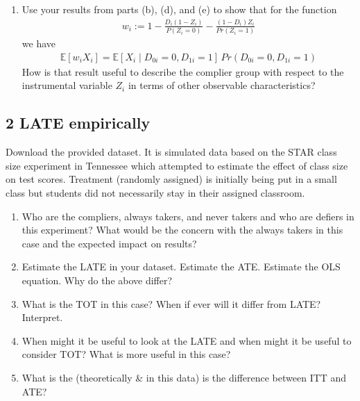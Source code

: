 \documentclass[11pt]{article}
\begin{document}
\begin{enumerate}[label=\alph*)]
    \item Use your results from parts (b), (d), and (e) to show that for the function 
    \begin{align*}
        w_i := 1 - \frac{D_i(1 - Z_i)}{P (Z_i=0)} -  \frac{(1-D_i)Z_i }{Pr (Z_i=1)}
    \end{align*} we have 
    \begin{align*}
        \mathbb{E}[w_i X_i] = \mathbb{E}[X_i \mid D_{0i} = 0, D_{1i} = 1]\, Pr(D_{0i} = 0, D_{1i} = 1)
    \end{align*} How is that result useful to describe the complier group with respect to the instrumental variable $Z_i$ in terms of other observable characteristics?

\end{enumerate}



\subsection*{2 LATE empirically}
Download the provided dataset. It is simulated data based on the STAR class size experiment in Tennessee which attempted to estimate the effect of class size on test scores. Treatment (randomly assigned) is initially being put in a small class but students did not necessarily stay in their assigned classroom.

\begin{enumerate}[label=\alph*)]
    \item Who are the compliers, always takers, and never takers and who are defiers in this experiment? What would be the concern with the always takers in this case and the expected impact on results?
    \item Estimate the LATE in your dataset. Estimate the ATE. Estimate the OLS equation. Why do the above differ?
    \item What is the TOT in this case? When if ever will it differ from LATE? Interpret.
    \item When might it be useful to look at the LATE and when might it be useful to consider TOT? What is more useful in this case?
    \item What is the (theoretically \& in this data) is the difference between ITT and ATE?
\end{enumerate}
\end{document}
